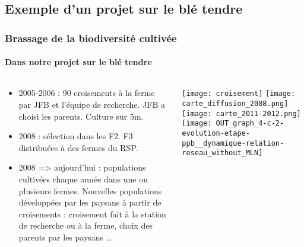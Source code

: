 \subsection{Exemple d'un projet sur le blé tendre}

\begin{frame}
\frametitle{Brassage de la biodiversité cultivée}
\framesubtitle{Dans notre projet sur le blé tendre}

\begin{columns}

	\begin{column}{.6\textwidth}
	\begin{itemize}
	\item<1-> 2005-2006 : 90 croisements à la ferme par JFB et l'équipe de recherche. JFB a choisi les parents. Culture sur 5m.
	\item<2-> 2008 : sélection dans les F2. F3 distribuées à des fermes du RSP.
	\item<3-> 2008 => aujourd'hui : populations cultivées chaque année dans une ou plusieurs fermes.
Nouvelles populations développées par les paysans à partir de croisements : croisement fait à la station de recherche ou à la ferme, choix des parents par les paysans \dots
	\end{itemize}
	\end{column}

	\begin{column}{.4\textwidth}
	\begin{center}
	\begin{overprint}
     \texttt{[image: croisement]}
     \texttt{[image: carte\_diffusion\_2008.png]}
	\onslide<3> \texttt{[image: carte\_2011-2012.png]}
	\onslide<4> \texttt{[image: OUT\_graph\_4-c-2-evolution-etape-ppb\_\_dynamique-relation-reseau\_without\_MLN]}
	\end{overprint}
	\end{center}

	\end{column}
\end{columns}

\end{frame}
